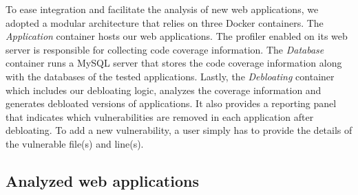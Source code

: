 To ease integration and facilitate the analysis of new web applications, we
adopted a modular architecture that relies on three Docker containers. The
\textit{Application} container hosts our web applications.  The profiler
enabled on its web server is responsible for collecting code coverage
information. The \textit{Database} container runs a MySQL server that
stores the code coverage information along with the databases of the tested
applications. Lastly, the \textit{Debloating} container which includes our
debloating logic, analyzes the coverage information and generates debloated
versions of applications. It also provides a reporting panel that indicates
which vulnerabilities are removed in each application after debloating. To add
a new vulnerability, a user simply has to provide the details of the vulnerable
file(s) and line(s).



\subsection{Analyzed web applications}
\label{subsec:webapps}


